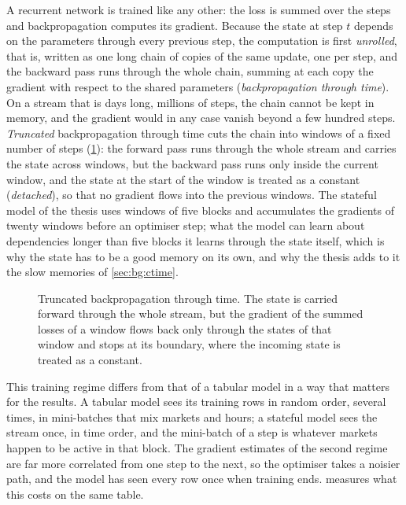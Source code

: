 A recurrent network is trained like any other: the loss is summed over the steps and
backpropagation computes its gradient.  Because the state at step $t$ depends on the
parameters through every previous step, the computation is first \emph{unrolled}, that
is, written as one long chain of copies of the same update, one per step, and the backward
pass runs through the whole chain, summing at each copy the gradient with respect to the
shared parameters (\emph{backpropagation through time}).  On a stream that is days long,
millions of steps, the chain cannot be kept in memory, and the gradient would in any case
vanish beyond a few hundred steps.  \emph{Truncated} backpropagation through time
\cite{williams1990tbptt} cuts the chain into windows of a fixed number of steps
(\cref{fig:bg:tbptt}): the forward pass runs through the whole stream and carries the state
across windows, but the backward pass runs only inside the current window, and the state at
the start of the window is treated as a constant (\emph{detached}), so that no gradient
flows into the previous windows.  The stateful model of the thesis uses windows of five
blocks and accumulates the gradients of twenty windows before an optimiser step; what the
model can learn about dependencies longer than five blocks it learns through the state
itself, which is why the state has to be a good memory on its own, and why the thesis adds
to it the slow memories of \cref{sec:bg:ctime}.

\begin{figure}[t]
\centering
\resizebox{\textwidth}{!}{}
\caption{Truncated backpropagation through time.  The state is carried forward through
the whole stream, but the gradient of the summed losses of a window flows back only through
the states of that window and stops at its boundary, where the incoming state is treated as
a constant.}
\label{fig:bg:tbptt}
\end{figure}

This training regime differs from that of a tabular model in a way that matters for the
results.  A tabular model sees its training rows in random order, several times, in
mini-batches that mix markets and hours; a stateful model sees the stream once, in time
order, and the mini-batch of a step is whatever markets happen to be active in that block.
The gradient estimates of the second regime are far more correlated from one step to the
next, so the optimiser takes a noisier path, and the model has seen every row once when
training ends.   measures what this costs on the same table.

